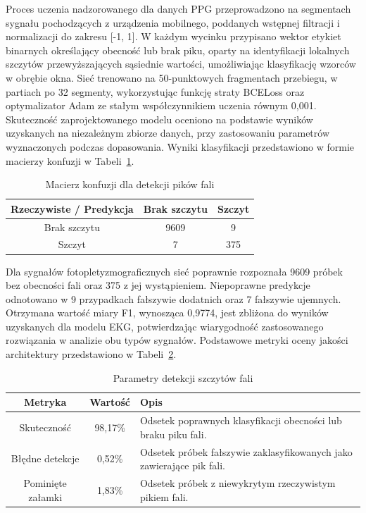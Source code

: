 \documentclass[journal]{IEEEtran}
\begin{document}
{Proces uczenia nadzorowanego dla danych PPG przeprowadzono na segmentach sygnału pochodzących z urządzenia mobilnego, poddanych wstępnej filtracji i normalizacji do zakresu [-1, 1]. W każdym wycinku przypisano wektor etykiet binarnych określający obecność lub brak piku, oparty na identyfikacji lokalnych szczytów przewyższających sąsiednie wartości, umożliwiając klasyfikację wzorców w obrębie okna. Sieć trenowano na 50-punktowych fragmentach przebiegu, w partiach po 32 segmenty, wykorzystując funkcję straty BCELoss oraz optymalizator Adam ze stałym współczynnikiem uczenia równym 0,001. Skuteczność zaprojektowanego modelu oceniono na podstawie wyników uzyskanych na niezależnym zbiorze danych, przy zastosowaniu parametrów wyznaczonych podczas dopasowania. Wyniki klasyfikacji przedstawiono w formie macierzy konfuzji w Tabeli~\ref{tab:conf_matrix_ppg}.

\begin{table}[ht]
\centering
\caption{Macierz konfuzji dla detekcji pików fali}
\label{tab:conf_matrix_ppg}
\begin{tabular}{|c|c|c|}
\hline
\textbf{Rzeczywiste / Predykcja} & \textbf{Brak szczytu } & \textbf{Szczyt} \\
\hline
Brak szczytu  & 9609 & 9 \\

Szczyt  & 7 & 375 \\
\hline
\end{tabular}
\end{table}

Dla sygnałów fotopletyzmograficznych sieć poprawnie rozpoznała 9609 próbek bez obecności fali oraz 375 z jej wystąpieniem. Niepoprawne predykcje odnotowano w 9 przypadkach fałszywie dodatnich oraz 7  fałszywie ujemnych. Otrzymana wartość miary F1, wynosząca 0,9774, jest zbliżona do wyników uzyskanych dla modelu EKG, potwierdzając wiarygodność zastosowanego rozwiązania w analizie obu typów sygnałów.
Podstawowe metryki oceny jakości architektury przedstawiono w Tabeli~\ref{tab:metrics_ppg}.

\begin{table}[ht]
\centering
\caption{Parametry detekcji szczytów fali}
\label{tab:metrics_ppg}
\begin{tabular}{|c|c|p{4.6cm}|}
\hline
\textbf{Metryka} & \textbf{Wartość} & \textbf{Opis} \\
\hline
Skuteczność & 98,17\% & Odsetek poprawnych klasyfikacji obecności lub braku piku fali. \\
Błędne detekcje & 0,52\% & Odsetek próbek fałszywie zaklasyfikowanych jako zawierające pik fali. \\
Pominięte załamki & 1,83\% & Odsetek próbek z niewykrytym rzeczywistym pikiem fali. \\
\hline
\end{tabular}
\end{table}

}
\end{document}
